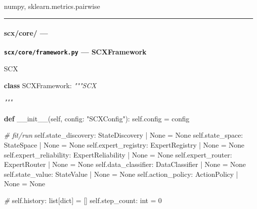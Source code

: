 \documentclass[
  12pt,
]{article}
\newenvironment{Shaded}{}{}
\newcommand{\BuiltInTok}[1]{\textcolor[rgb]{0.00,0.50,0.00}{#1}}
\newcommand{\CommentTok}[1]{\textcolor[rgb]{0.38,0.63,0.69}{\textit{#1}}}
\newcommand{\DecValTok}[1]{\textcolor[rgb]{0.25,0.63,0.44}{#1}}
\newcommand{\FunctionTok}[1]{\textcolor[rgb]{0.02,0.16,0.49}{#1}}
\newcommand{\KeywordTok}[1]{\textcolor[rgb]{0.00,0.44,0.13}{\textbf{#1}}}
\newcommand{\NormalTok}[1]{#1}
\newcommand{\OperatorTok}[1]{\textcolor[rgb]{0.40,0.40,0.40}{#1}}
\newcommand{\StringTok}[1]{\textcolor[rgb]{0.25,0.44,0.63}{#1}}
\newcommand{\VariableTok}[1]{\textcolor[rgb]{0.10,0.09,0.49}{#1}}
\begin{document}
numpy, sklearn.metrics.pairwise

\begin{center}\rule{0.5\linewidth}{0.5pt}\end{center}

\paragraph{scx/core/ ---
}\label{scxcore-ux6838ux5fc3ux6846ux67b6ux6a21ux5757}

\textbf{\texttt{scx/core/framework.py} --- SCXFramework}

SCX 

\begin{Shaded}
\begin{Highlighting}[]
\KeywordTok{class}\NormalTok{ SCXFramework:}
    \CommentTok{"""SCX }

\CommentTok{    }
\CommentTok{    """}

    \KeywordTok{def} \FunctionTok{\_\_init\_\_}\NormalTok{(}\VariableTok{self}\NormalTok{, config: }\StringTok{"SCXConfig"}\NormalTok{):}
        \VariableTok{self}\NormalTok{.config }\OperatorTok{=}\NormalTok{ config}

        \CommentTok{\#  fit/run }
        \VariableTok{self}\NormalTok{.state\_discovery: StateDiscovery }\OperatorTok{|} \VariableTok{None} \OperatorTok{=} \VariableTok{None}
        \VariableTok{self}\NormalTok{.state\_space: StateSpace }\OperatorTok{|} \VariableTok{None} \OperatorTok{=} \VariableTok{None}
        \VariableTok{self}\NormalTok{.expert\_registry: ExpertRegistry }\OperatorTok{|} \VariableTok{None} \OperatorTok{=} \VariableTok{None}
        \VariableTok{self}\NormalTok{.expert\_reliability: ExpertReliability }\OperatorTok{|} \VariableTok{None} \OperatorTok{=} \VariableTok{None}
        \VariableTok{self}\NormalTok{.expert\_router: ExpertRouter }\OperatorTok{|} \VariableTok{None} \OperatorTok{=} \VariableTok{None}
        \VariableTok{self}\NormalTok{.data\_classifier: DataClassifier }\OperatorTok{|} \VariableTok{None} \OperatorTok{=} \VariableTok{None}
        \VariableTok{self}\NormalTok{.state\_value: StateValue }\OperatorTok{|} \VariableTok{None} \OperatorTok{=} \VariableTok{None}
        \VariableTok{self}\NormalTok{.action\_policy: ActionPolicy }\OperatorTok{|} \VariableTok{None} \OperatorTok{=} \VariableTok{None}

        \CommentTok{\# }
        \VariableTok{self}\NormalTok{.history: }\BuiltInTok{list}\NormalTok{[}\BuiltInTok{dict}\NormalTok{] }\OperatorTok{=}\NormalTok{ []}
        \VariableTok{self}\NormalTok{.step\_count: }\BuiltInTok{int} \OperatorTok{=} \DecValTok{0}


\end{Highlighting}
\end{Shaded}
\end{document}

